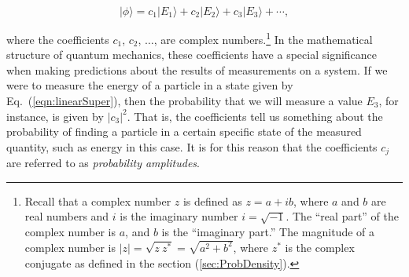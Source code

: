 \begin{equation}
|\mbox{$\phi$}\rangle = c_1 |\mbox{$E_1$}\rangle + c_2 |\mbox{$E_2$}\rangle + c_3 |\mbox{$E_3$}\rangle + \cdots ,
\label{eqn:linearSuper}
\end{equation}

\noindent where the coefficients $c_1$, $c_2$, $\ldots$, are complex
numbers.\footnote{Recall that a complex number $z$ is defined as $z = a +
ib$, where $a$ and $b$ are real numbers and $i$ is the imaginary number
$i=\sqrt{-1}$. The ``real part'' of the complex number is $a$, and $b$
is the ``imaginary part.'' The magnitude of a complex number is $|z| =
\sqrt{z\ z^*}= \sqrt{a^2 + b^2}$, where $z^*$ is the complex conjugate as
defined in the section (\ref{sec:ProbDensity}).}  In the mathematical
structure of quantum mechanics, these coefficients have a special
significance when making predictions about the results of measurements
on a system.  If we were to measure the energy of a particle in a state
given by Eq.~(\ref{eqn:linearSuper}), then the probability that we will
measure a value $E_3$, for instance, is given by $|c_3|^2$.  That is,
the coefficients tell us something about the probability of finding a
particle in a certain specific state of the measured quantity, such as
energy in this case. It is for this reason that the coefficients $c_j$
are referred to as {\em probability amplitudes}.

